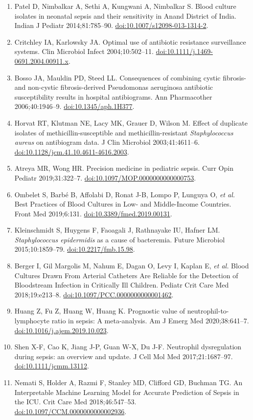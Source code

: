 \documentclass[
]{book}
\begin{document}
\begin{enumerate}
\item
  Patel D, Nimbalkar A, Sethi A, Kungwani A, Nimbalkar S. Blood culture isolates in neonatal sepsis and their sensitivity in Anand District of India. Indian J Pediatr 2014;81:785--90. \url{doi:10.1007/s12098-013-1314-2}.
\item
  Critchley IA, Karlowsky JA. Optimal use of antibiotic resistance surveillance systems. Clin Microbiol Infect 2004;10:502--11. \url{doi:10.1111/j.1469-0691.2004.00911.x}.
\item
  Bosso JA, Mauldin PD, Steed LL. Consequences of combining cystic fibrosis- and non-cystic fibrosis-derived Pseudomonas aeruginosa antibiotic susceptibility results in hospital antibiograms. Ann Pharmacother 2006;40:1946--9. \url{doi:10.1345/aph.1H377}.
\item
  Horvat RT, Klutman NE, Lacy MK, Grauer D, Wilson M. Effect of duplicate isolates of methicillin-susceptible and methicillin-resistant \emph{Staphylococcus aureus} on antibiogram data. J Clin Microbiol 2003;41:4611--6. \url{doi:10.1128/jcm.41.10.4611-4616.2003}.
\item
  Atreya MR, Wong HR. Precision medicine in pediatric sepsis. Curr Opin Pediatr 2019;31:322--7. \url{doi:10.1097/MOP.0000000000000753}.
\item
  Ombelet S, Barbé B, Affolabi D, Ronat J-B, Lompo P, Lunguya O, \emph{et al.} Best Practices of Blood Cultures in Low- and Middle-Income Countries. Front Med 2019;6:131. \url{doi:10.3389/fmed.2019.00131}.
\item
  Kleinschmidt S, Huygens F, Faoagali J, Rathnayake IU, Hafner LM. \emph{Staphylococcus epidermidis} as a cause of bacteremia. Future Microbiol 2015;10:1859--79. \url{doi:10.2217/fmb.15.98}.
\item
  Berger I, Gil Margolis M, Nahum E, Dagan O, Levy I, Kaplan E, \emph{et al.} Blood Cultures Drawn From Arterial Catheters Are Reliable for the Detection of Bloodstream Infection in Critically Ill Children. Pediatr Crit Care Med 2018;19:e213--8. \url{doi:10.1097/PCC.0000000000001462}.
\item
  Huang Z, Fu Z, Huang W, Huang K. Prognostic value of neutrophil-to-lymphocyte ratio in sepsis: A meta-analysis. Am J Emerg Med 2020;38:641--7. \url{doi:10.1016/j.ajem.2019.10.023}.
\item
  Shen X-F, Cao K, Jiang J-P, Guan W-X, Du J-F. Neutrophil dysregulation during sepsis: an overview and update. J Cell Mol Med 2017;21:1687--97. \url{doi:10.1111/jcmm.13112}.
\item
  Nemati S, Holder A, Razmi F, Stanley MD, Clifford GD, Buchman TG. An Interpretable Machine Learning Model for Accurate Prediction of Sepsis in the ICU. Crit Care Med 2018;46:547--53. \url{doi:10.1097/CCM.0000000000002936}.
\end{enumerate}
\end{document}
